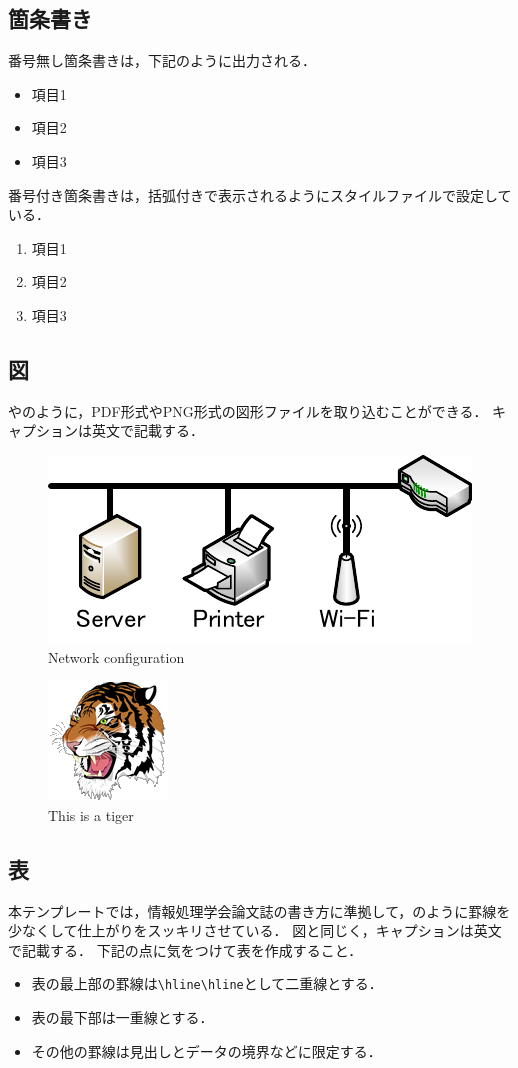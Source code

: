 \documentclass[a4j,9pt,twocolumn,uplatex]{jsarticle}
\begin{document}
\subsection{箇条書き}
番号無し箇条書きは，下記のように出力される．
\begin{itemize}
    \item 項目1
    \item 項目2
    \item 項目3
\end{itemize}

番号付き箇条書きは，括弧付きで表示されるようにスタイルファイルで設定している．
\begin{enumerate}
    \item 項目1
    \item 項目2
    \item 項目3
\end{enumerate}

\subsection{図}
やのように，PDF形式やPNG形式の図形ファイルを取り込むことができる．
キャプションは英文で記載する．

\begin{figure}[tb]
    \centering
    \includegraphics[width=0.5\linewidth,clip]{fig/network.pdf}
    \caption{Network configuration}
    \label{fig:network}
\end{figure}

\begin{figure}[tb]
    \centering
    \includegraphics[scale=0.95,clip]{fig/tiger.png}
    \caption{This is a tiger}
    \label{fig:tiger}
\end{figure}

\subsection{表}
本テンプレートでは，情報処理学会論文誌の書き方に準拠して，のように罫線を少なくして仕上がりをスッキリさせている．
図と同じく，キャプションは英文で記載する．
下記の点に気をつけて表を作成すること．
\begin{itemize}
    \item 表の最上部の罫線は\verb|\hline\hline|として二重線とする．
    \item 表の最下部は一重線とする．
    \item その他の罫線は見出しとデータの境界などに限定する．
\end{itemize}
\end{document}
